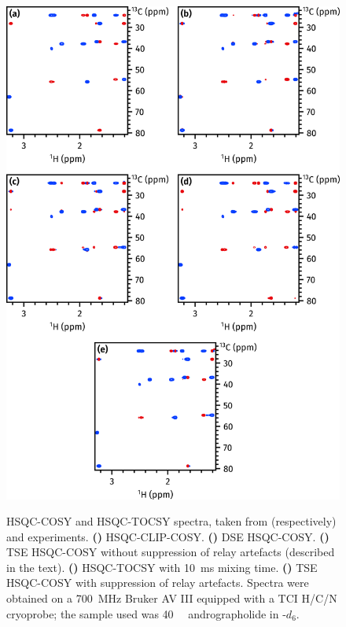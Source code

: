 \documentclass[a4paper,12pt]{article}
\newcommand{\andro}{Spectra were obtained on a \SI{700}{\MHz} Bruker AV III equipped with a TCI H/C/N cryoprobe; the sample used was \SI{40}{\milli\molar} andrographolide in \ch{DMSO}-$d_6$.}
\begin{document}
\begin{refsection}
\begin{figure}[!htp]
    \centering
    \includegraphics[]{hsqccosy_comp.png}%
    {\label{fig:hsqccosy_comp_clip}}%
    {\label{fig:hsqccosy_comp_dse}}%
    {\label{fig:hsqccosy_comp_tse_norps}}%
    {\label{fig:hsqccosy_comp_tocsy}}%
    {\label{fig:hsqccosy_comp_tse}}%
    \caption[Comparison of spectra acquired with different HSQC-COSY modules]{
        HSQC-COSY and HSQC-TOCSY spectra, taken from (respectively)  and  experiments.
        \textbf{()} HSQC-CLIP-COSY.
        \textbf{()} DSE HSQC-COSY.
        \textbf{()} TSE HSQC-COSY without suppression of relay artefacts (described in the text).
        \textbf{()} HSQC-TOCSY with \qty{10}{\ms} mixing time.
        \textbf{()} TSE HSQC-COSY with suppression of relay artefacts.
        \andro{}
    }
    \label{fig:hsqccosy_comp}
\end{figure}


\end{refsection}
\end{document}
